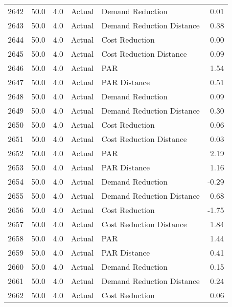 \begin{longtable}{lrrllr}
2642 &         50.0 &     4.0 &         Actual &           Demand Reduction &   0.01 \\
2643 &         50.0 &     4.0 &         Actual &  Demand Reduction Distance &   0.38 \\
2644 &         50.0 &     4.0 &         Actual &             Cost Reduction &   0.00 \\
2645 &         50.0 &     4.0 &         Actual &    Cost Reduction Distance &   0.09 \\
2646 &         50.0 &     4.0 &         Actual &                        PAR &   1.54 \\
2647 &         50.0 &     4.0 &         Actual &               PAR Distance &   0.51 \\
2648 &         50.0 &     4.0 &         Actual &           Demand Reduction &   0.09 \\
2649 &         50.0 &     4.0 &         Actual &  Demand Reduction Distance &   0.30 \\
2650 &         50.0 &     4.0 &         Actual &             Cost Reduction &   0.06 \\
2651 &         50.0 &     4.0 &         Actual &    Cost Reduction Distance &   0.03 \\
2652 &         50.0 &     4.0 &         Actual &                        PAR &   2.19 \\
2653 &         50.0 &     4.0 &         Actual &               PAR Distance &   1.16 \\
2654 &         50.0 &     4.0 &         Actual &           Demand Reduction &  -0.29 \\
2655 &         50.0 &     4.0 &         Actual &  Demand Reduction Distance &   0.68 \\
2656 &         50.0 &     4.0 &         Actual &             Cost Reduction &  -1.75 \\
2657 &         50.0 &     4.0 &         Actual &    Cost Reduction Distance &   1.84 \\
2658 &         50.0 &     4.0 &         Actual &                        PAR &   1.44 \\
2659 &         50.0 &     4.0 &         Actual &               PAR Distance &   0.41 \\
2660 &         50.0 &     4.0 &         Actual &           Demand Reduction &   0.15 \\
2661 &         50.0 &     4.0 &         Actual &  Demand Reduction Distance &   0.24 \\
2662 &         50.0 &     4.0 &         Actual &             Cost Reduction &   0.06 \\

\end{longtable}
